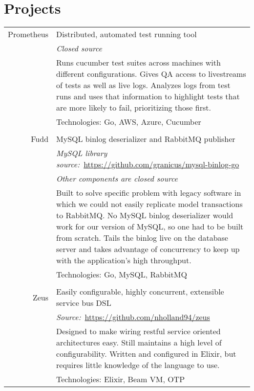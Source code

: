 \documentclass[a4paper,10pt]{article}
\begin{document}
\section{Projects}
\begin{tabular}{r|p{11cm}}
  Prometheus  & Distributed, automated test running tool\\
              & \emph{Closed source}\\
              & \footnotesize{Runs cucumber test suites across machines with different configurations. Gives QA access to livestreams of tests as well as live logs. Analyzes logs from test runs and uses that information to highlight tests that are more likely to fail, prioritizing those first.}\\
              & \footnotesize{Technologies: Go, AWS, Azure, Cucumber}\\
  \multicolumn{2}{c}{}\\
  Fudd        & MySQL binlog deserializer and RabbitMQ publisher\\
              & \emph{MySQL library source:}\ \href{https://github.com/granicus/mysql-binlog-go}{https://github.com/granicus/mysql-binlog-go}\\
              & \emph{Other components are closed source}\\
              & \footnotesize{Built to solve specific problem with legacy software in which we could not easily replicate model transactions to RabbitMQ. No MySQL binlog deserializer would work for our version of MySQL, so one had to be built from scratch. Tails the binlog live on the database server and takes advantage of concurrency to keep up with the application's high throughput.}\\
              & \footnotesize{Technologies: Go, MySQL, RabbitMQ}\\
  \multicolumn{2}{c}{}\\
  Zeus        & Easily configurable, highly concurrent, extensible service bus DSL\\
              & \emph{Source:}\ \href{https://github.com/nholland94/zeus}{https://github.com/nholland94/zeus}\\
              & \footnotesize{Designed to make wiring restful service oriented architectures easy. Still maintains a high level of configurability. Written and configured in Elixir, but requires little knowledge of the language to use.}\\
              & \footnotesize{Technologies: Elixir, Beam VM, OTP}\\
\end{tabular}
\end{document}
